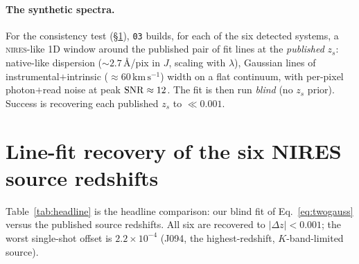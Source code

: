 \documentclass[11pt,letterpaper]{article}
\newcommand{\zs}{\ensuremath{z_s}}
\newcommand{\dz}{\ensuremath{\Delta z}}
\newcommand{\kms}{\ensuremath{\,\mathrm{km\,s^{-1}}}}
\newcommand{\NIRES}{\textsc{nires}}
\begin{document}
\paragraph{The synthetic spectra.} For the consistency test
(\S\ref{sec:linefit}), \texttt{03} builds, for each of the six detected
systems, a \NIRES-like 1D window around the published pair of fit lines at
the \emph{published} \zs{}: native-like dispersion (${\sim}2.7$\,\AA/pix in
$J$, scaling with $\lambda$), Gaussian lines of instrumental$+$intrinsic
($\approx60\kms$) width on a flat continuum, with per-pixel
photon$+$read noise at peak ${\rm SNR}\approx12$. The fit is then run
\emph{blind} (no \zs{} prior). Success is recovering each published \zs{}
to $\ll 0.001$.

\section{Line-fit recovery of the six NIRES source redshifts}
\label{sec:linefit}

Table~\ref{tab:headline} is the headline comparison: our blind fit of
Eq.~\ref{eq:twogauss} versus the published source redshifts. All six are
recovered to $|\dz| < 0.001$; the worst single-shot offset is
$2.2\times10^{-4}$ (J094, the highest-redshift, $K$-band-limited source).
\end{document}
